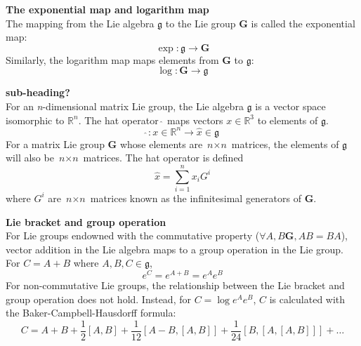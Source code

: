 		\textbf{The exponential map and logarithm map}\\		
			The mapping from the Lie algebra $\mathfrak{g}$ to the Lie group $\mathbf{G}$ is called the exponential map:
			\begin{equation}
				\exp: \mathfrak{g} \rightarrow \mathbf{G}
			\end{equation}			
			Similarly, the logarithm map maps elements from $\mathbf{G}$ to $\mathfrak{g}$:
			\begin{equation}
				\log: \mathbf{G} \rightarrow \mathfrak{g}
			\end{equation}
						
		\textbf{sub-heading?}\\
			For an \textit{n}-dimensional matrix Lie group, the Lie algebra $\mathfrak{g}$ is a vector space isomorphic to $\mathbb{R}^n$. The hat operator $\hat{\:}$ maps vectors $x \in \mathbb{R}^3$ to elements of $\mathfrak{g}$.				
			\begin{equation}
				\hat{\:}: x \in \mathbb{R}^n \rightarrow \hat{x} \in \mathfrak{g}
			\end{equation}		
			For a matrix Lie group $\mathbf{G}$ whose elements are $\textit{n} \times \textit{n}$ matrices, the elements of $\mathfrak{g}$ will also be $\textit{n} \times \textit{n}$ matrices. The hat operator is defined
			\begin{equation}
				\hat{x} = \sum\limits_{i=1}^n x_iG^i 
			\end{equation}
			where $G^i$ are $\textit{n} \times \textit{n}$ matrices known as the infinitesimal generators of $\mathbf{G}$.
						
		\textbf{Lie bracket and group operation}\\					
			For Lie groups endowned with the commutative property ($\forall A,B \mathbf{G}, AB = BA$), vector addition in the Lie algebra maps to a group operation in the Lie group. For $C = A + B$ where $A,B,C \in \mathfrak{g}$,
			\begin{equation}
				e^C = e^{A+B} = e^Ae^B
			\end{equation}
			For non-commutative Lie groups, the relationship between the Lie bracket and group operation does not hold. Instead, for $C = \log{e^Ae^B}$, $C$ is calculated with the Baker-Campbell-Hausdorff formula:
			\begin{equation}
				C = A + B + \frac{1}{2}[A,B] + \frac{1}{12}[A-B,[A,B]] + \frac{1}{24}[B,[A,[A,B]]] + \dots
			\end{equation}	
		
